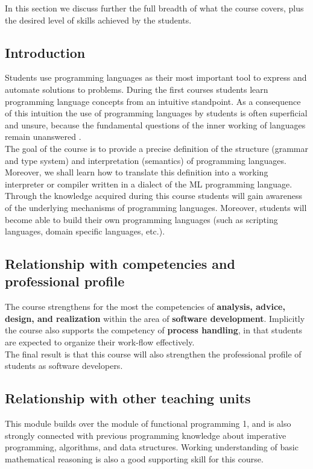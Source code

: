 \documentclass[a4paper, 10pt]{article}
\begin{document}
	In this section we discuss further the full breadth of what the course covers, plus the desired level of skills achieved by the students. 
	
	\subsection{Introduction}
		Students use programming languages as their most important tool to express and automate solutions to problems. During the first courses students learn programming language concepts from an intuitive standpoint. As a consequence of this intuition the use of programming languages by students is often superficial and unsure, because the fundamental questions of the inner working of languages remain unanswered \cite{intuitionInProgramming}. \\

		The goal of the course is to provide a precise definition of the structure (grammar and type system) and interpretation (semantics) \cite{hopcroft_ullman, TAPL, SICP} of programming languages. Moreover, we shall learn how to translate this definition into a working interpreter or compiler written in a dialect of the ML \cite{ML} programming language. \\
		
		Through the knowledge acquired during this course students will gain awareness of the underlying mechanisms of programming languages. Moreover, students will become able to build their own programming languages (such as scripting languages, domain specific languages, etc.). \\
		
	\subsection{Relationship with competencies and professional profile}
		The course strengthens for the most the competencies of \textbf{analysis, advice, design, and realization} within the area of \textbf{software development}. Implicitly the course also supports the competency of \textbf{process handling}, in that students are expected to organize their work-flow effectively. \\
		
		The final result is that this course will also strengthen the professional profile of students as software developers.
		
	\subsection{Relationship with other teaching units}
		This module builds over the module of functional programming 1, and is also strongly connected with previous programming knowledge about imperative programming, algorithms, and data structures. Working understanding of basic mathematical reasoning is also a good supporting skill for this course. \\
	
\end{document}
